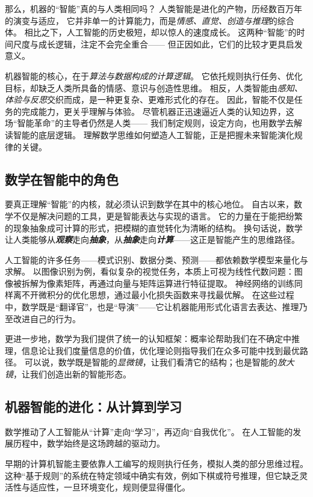 那么，机器的“智能”真的与人类相同吗？
人类智能是进化的产物，历经数百万年的演变与适应，
它并非单一的计算能力，而是\emph{情感、直觉、创造与推理}的综合体。
相比之下，人工智能的历史极短，却以惊人的速度成长。
这两种“智能”的时间尺度与成长逻辑，注定不会完全重合——
但正因如此，它们的比较才更具启发意义。

机器智能的核心，在于\emph{算法与数据构成的计算逻辑}。
它依托规则执行任务、优化目标，却缺乏人类所具备的情感、意识与创造性思维。
相反，人类智能由\emph{感知、体验与反思}交织而成，是一种更复杂、更难形式化的存在。
因此，智能不仅是任务的完成能力，更关乎理解与体验。
尽管机器正迅速逼近人类的认知边界，这场“智能革命”的主导者仍然是人类——
我们制定规则，设定方向，也用数学去解读智能的底层逻辑。
理解数学思维如何塑造人工智能，正是把握未来智能演化规律的关键。

\subsection{数学在智能中的角色}

要真正理解“智能”的内核，就必须认识到数学在其中的核心地位。
自古以来，数学不仅是解决问题的工具，更是智能表达与实现的语言。
它的力量在于能把纷繁的现象抽象成可计算的形式，把模糊的直觉转化为清晰的结构。
换句话说，数学让人类能够从\emph{\bf 观察}走向\emph{\bf  抽象}，从\emph{\bf  抽象}走向\emph{\bf  计算}——这正是智能产生的思维路径。

人工智能的许多任务——模式识别、数据分类、预测——都依赖数学模型来量化与求解。
以图像识别为例，看似复杂的视觉任务，本质上可视为线性代数问题：图像被拆解为像素矩阵，再通过向量与矩阵运算进行特征提取。
神经网络的训练同样离不开微积分的优化思想，通过最小化损失函数来寻找最优解。
在这些过程中，数学既是“翻译官”，也是“导演”——它让机器能用形式化语言去表达、推理乃至改进自己的行为。

更进一步地，数学为我们提供了统一的认知框架：概率论帮助我们在不确定中推理，信息论让我们度量信息的价值，优化理论则指导我们在众多可能中找到最优路径。
可以说，数学既是智能的\emph{显微镜}，让我们看清它的结构；也是智能的\emph{放大镜}，让我们创造出新的智能形态。

\subsection{机器智能的进化：从计算到学习}

数学推动了人工智能从“计算”走向“学习”，再迈向“自我优化”。
在人工智能的发展历程中，数学始终是这场跨越的驱动力。

早期的计算机智能主要依靠人工编写的规则执行任务，模拟人类的部分思维过程。
这种“基于规则”的系统在特定领域中确实有效，例如下棋或符号推理，但它缺乏灵活性与适应性，一旦环境变化，规则便显得僵化。

